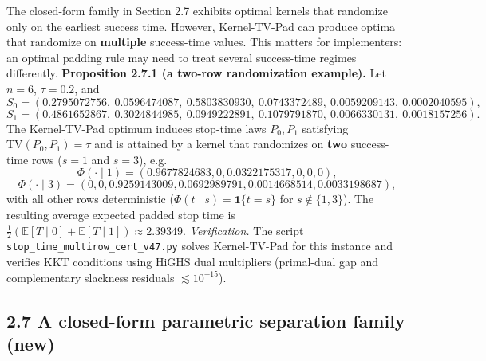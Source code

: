 \documentclass[11pt]{article}
\begin{document}
The closed-form family in Section 2.7 exhibits optimal kernels that
randomize only on the earliest success time. However, Kernel-TV-Pad can
produce optima that randomize on \textbf{multiple} success-time values.
This matters for implementers: an optimal padding rule may need to treat
several success-time regimes differently. \textbf{Proposition 2.7.1 (a
two-row randomization example).} Let \(n=6\), \(\tau=0.2\), and \[
S_0=(0.2795072756,\ 0.0596474087,\ 0.5803830930,\ 0.0743372489,\ 0.0059209143,\ 0.0002040595),
\] \[
S_1=(0.4861652867,\ 0.3024844985,\ 0.0949222891,\ 0.1079791870,\ 0.0066330131,\ 0.0018157256).
\] The Kernel-TV-Pad optimum induces stop-time laws \(P_0,P_1\)
satisfying \(\mathrm{TV}(P_0,P_1)=\tau\) and is attained by a kernel
that randomizes on \textbf{two} success-time rows (\(s=1\) and \(s=3\)),
e.g. \[
\Phi(\cdot\mid 1)=(0.9677824683,0,0.0322175317,0,0,0),
\] \[
\Phi(\cdot\mid 3)=(0,0,0.9259143009,0.0692989791,0.0014668514,0.0033198687),
\] with all other rows deterministic
(\(\Phi(t\mid s)=\mathbf{1}\{t=s\}\) for \(s\notin\{1,3\}\)). The
resulting average expected padded stop time is
\(\tfrac12(\mathbb{E}[T\mid 0]+\mathbb{E}[T\mid 1])\approx 2.39349\).
\emph{Verification.} The script
\texttt{stop\_time\_multirow\_cert\_v47.py} solves Kernel-TV-Pad for
this instance and verifies KKT conditions using HiGHS dual multipliers
(primal-dual gap and complementary slackness residuals
\(\lesssim 10^{-15}\)).

\hypertarget{a-closed-form-parametric-separation-family-new}{%
\subsection{2.7 A closed-form parametric separation family
(new)}\label{a-closed-form-parametric-separation-family-new}}
\end{document}
